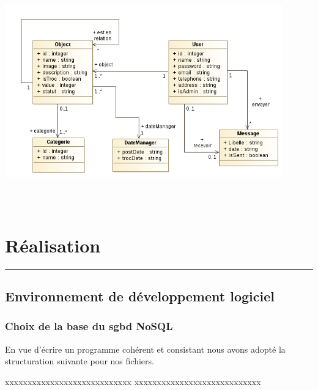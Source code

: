 \documentclass[12pt]{report}
\begin{document}
		 	\begin{center}
		 		\includegraphics[scale=1, width=0.9\textwidth, height=10cm]{class}
		 		\label{class}
		 	\end{center}
	
	 
	
	 
	 
	\newpage
	\section{\sc Réalisation}
		\rule{1 \textwidth}{0.5pt} \textbf{}
		\vspace{2em}
	
	\subsection{\sc Environnement de développement logiciel}
	
	
	\subsubsection{\sc Choix de la base du sgbd NoSQL}
	
	En vue d'écrire un programme cohérent et consistant nous avons adopté la structuration suivante pour nos  fichiers.
	
	xxxxxxxxxxxxxxxxxxxxxxxxxxxx
	xxxxxxxxxxxxxxxxxxxxxxxxxxxx
	
\end{document}
